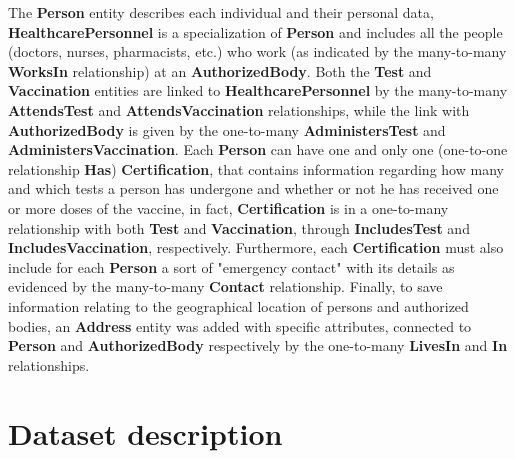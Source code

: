 \documentclass[a4paper,12pt]{article}
\begin{document}
The \textbf{Person} entity describes each individual and their personal data, \textbf{HealthcarePersonnel} is a specialization of \textbf{Person} and includes all the people (doctors, nurses, pharmacists, etc.) who work (as indicated by the many-to-many \textbf{WorksIn} relationship) at an \textbf{AuthorizedBody}. Both the \textbf{Test} and \textbf{Vaccination} entities are linked to \textbf{HealthcarePersonnel} by the many-to-many \textbf{AttendsTest} and \textbf{AttendsVaccination} relationships, while the link with \textbf{AuthorizedBody} is given by the one-to-many \textbf{AdministersTest} and \textbf{AdministersVaccination}. Each \textbf{Person} can have one and only one (one-to-one relationship \textbf{Has}) \textbf{Certification}, that contains information regarding how many and which tests a person has undergone and whether or not he has received one or more doses of the vaccine, in fact, \textbf{Certification} is in a one-to-many relationship with both \textbf{Test} and \textbf{Vaccination}, through \textbf{IncludesTest} and \textbf{IncludesVaccination}, respectively. Furthermore, each \textbf{Certification} must also include for each \textbf{Person} a sort of "emergency contact" with its details as evidenced by the many-to-many \textbf{Contact} relationship. Finally, to save information relating to the geographical location of persons and authorized bodies, an \textbf{Address} entity was added with specific attributes, connected to \textbf{Person} and \textbf{AuthorizedBody} respectively by the one-to-many \textbf{LivesIn} and \textbf{In} relationships.
\section{Dataset description}
\end{document}
